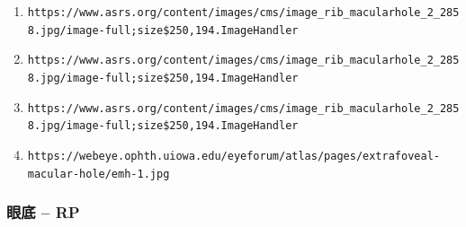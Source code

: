 \documentclass{article}
\begin{document}
\begin{enumerate}
			\item \nolinkurl{https://www.asrs.org/content/images/cms/image_rib_macularhole_2_2858.jpg/image-full;size$250,194.ImageHandler}
			
			\item \nolinkurl{https://www.asrs.org/content/images/cms/image_rib_macularhole_2_2858.jpg/image-full;size$250,194.ImageHandler}
			
			\item \nolinkurl{https://www.asrs.org/content/images/cms/image_rib_macularhole_2_2858.jpg/image-full;size$250,194.ImageHandler}
			
			\item \nolinkurl{https://webeye.ophth.uiowa.edu/eyeforum/atlas/pages/extrafoveal-macular-hole/emh-1.jpg}
	\end{enumerate}
	
	\subsubsection*{眼底 -- RP}
	\vspace{0.5cm}
		
\end{document}
